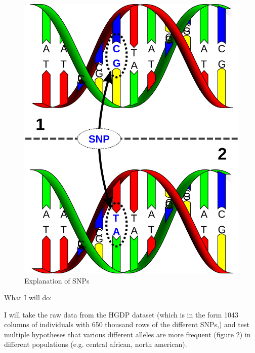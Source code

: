 \documentclass{scrartcl}
\begin{document}
\begin{figure}[h!]
  \caption{Explanation of SNPs}
  \centering
   \includegraphics[scale = .06]{figures/snp_explanation.png}
\end{figure}

{\Large What I will do:}
\vspace{.7em}

I will take the raw data from the HGDP dataset (which is in the form 1043 columns of individuals with 650 thousand rows of the different SNPs,) and test multiple hypotheses that various different alleles are more frequent (figure 2) in different populations (e.g. central african, north american). 
\vspace{0.5em}
\end{document}
